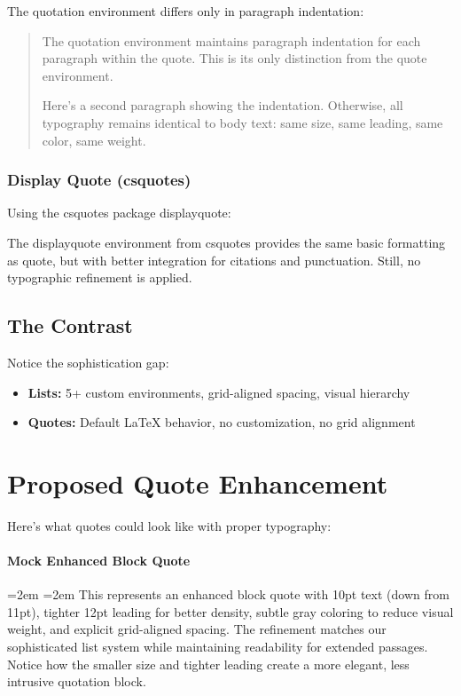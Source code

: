 \documentclass[11pt]{article}
\begin{document}
The quotation environment differs only in paragraph indentation:

\begin{quotation}
The quotation environment maintains paragraph indentation for each paragraph within the quote. This is its only distinction from the quote environment.

Here's a second paragraph showing the indentation. Otherwise, all typography remains identical to body text: same size, same leading, same color, same weight.
\end{quotation}

\subsubsection{Display Quote (csquotes)}

Using the csquotes package displayquote:

\begin{displayquote}
The displayquote environment from csquotes provides the same basic formatting as quote, but with better integration for citations and punctuation. Still, no typographic refinement is applied.
\end{displayquote}

\subsection{The Contrast}

Notice the sophistication gap:
\begin{itemize}
\item \textbf{Lists:} 5+ custom environments, grid-aligned spacing, visual hierarchy
\item \textbf{Quotes:} Default LaTeX behavior, no customization, no grid alignment
\end{itemize}

\section{Proposed Quote Enhancement}

Here's what quotes could look like with proper typography:

\paragraph{Mock Enhanced Block Quote} 
\begingroup
\par\vspace{6.6pt}%
\leftskip=2em \rightskip=2em
\small%
\linespread{1.09}\selectfont%
\color{subtlegray}%
\noindent
This represents an enhanced block quote with 10pt text (down from 11pt), tighter 12pt leading for better density, subtle gray coloring to reduce visual weight, and explicit grid-aligned spacing. The refinement matches our sophisticated list system while maintaining readability for extended passages. Notice how the smaller size and tighter leading create a more elegant, less intrusive quotation block.
\par\vspace{6.6pt}%
\endgroup
\end{document}
